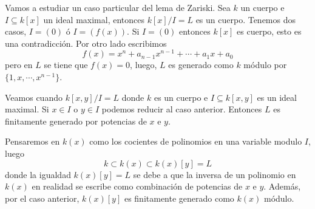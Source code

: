 \documentclass{article}
\begin{document}
\noindent Vamos a estudiar un caso particular del lema de Zariski. Sea $k$ un cuerpo e 
$I\subseteq k[x]$ un ideal maximal, entonces $k[x]/I=L$ es un cuerpo. Tenemos dos casos, 
$I=(0)$ ó $I=(f(x))$. Si $I=(0)$ entonces $k[x]$ es cuerpo, esto es una contradicción. Por otro 
lado escribimos
\begin{equation*}
    f(x)=x^{n}+a_{n-1}x^{n-1}+\cdots+a_{1}x+a_{0}
\end{equation*}
pero en $L$ se tiene que $f(x)=0$, luego, $L$ es generado como $k$ módulo por 
$\{1,x,\cdots,x^{n-1}\}$.
\vspace{4mm}

\noindent Veamos cuando $k[x,y]/I=L$ donde $k$ es un cuerpo e $I\subseteq k[x,y]$ es un ideal 
maximal. Si $x\in I$ o $y\in I$ podemos reducir al caso anterior. Entonces $L$ es finitamente 
generado por potencias de $x$ e $y$. 
\vspace{4mm}

\noindent Pensaremos en $k(x)$ como los cocientes de polinomios en una variable modulo $I$, luego
\begin{equation*}
    k\subset k(x)\subset k(x)[y]=L
\end{equation*}
donde la igualdad $k(x)[y]=L$ se debe a que la inversa de un polinomio en $k(x)$ en realidad se 
escribe como combinación de potencias de $x$ e $y$. Además, por el caso anterior, $k(x)[y]$ es
finitamente generado como $k(x)$ módulo.

\vspace{4mm}
\end{document}
